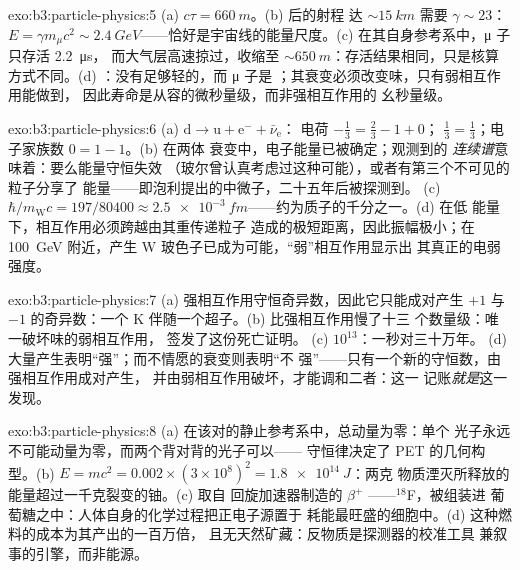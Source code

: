 \begin{solution}{exo:b3:particle-physics:5}
(a) $c\tau = \qty{660}{m}$。(b) 后的射程
达 ${\sim}\qty{15}{km}$ 需要 $\gamma \sim 23$：$E = \gamma
m_\mu c^2 \sim \qty{2.4}{GeV}$——恰好是宇宙线的能量尺度。(c)
在其自身参考系中，μ 子只存活 \qty{2.2}{\micro s}，
而大气层高速掠过，收缩至
${\sim}\qty{650}{m}$：存活结果相同，只是核算方式不同。(d) ：没有足够轻的，而 μ 子是
；其衰变必须改变味，只有弱相互作用能做到，
因此寿命是从容的微秒量级，而非强相互作用的
幺秒量级。
\end{solution}

\begin{solution}{exo:b3:particle-physics:6}
(a) $\text{d} \to \text{u} + \text{e}^- + \bar\nu_{\text{e}}$：
电荷 $-\tfrac13 = \tfrac23 - 1 + 0$；
$\tfrac13 = \tfrac13$；电子家族数 $0 = 1 - 1$。(b) 在两体
衰变中，电子能量已被确定；观测到的
\emph{连续谱}意味着：要么能量守恒失效
（玻尔曾认真考虑过这种可能），或者有第三个不可见的粒子分享了
能量——即泡利提出的中微子，二十五年后被探测到。
(c) $\hbar/m_{\text{W}}c = 197/80400 \approx
\qty{2.5e-3}{fm}$——约为质子的千分之一。(d) 在低
能量下，相互作用必须跨越由其重传递粒子
造成的极短距离，因此振幅极小；在
\qty{100}{GeV} 附近，产生 W 玻色子已成为可能，“弱”相互作用显示出
其真正的电弱强度。
\end{solution}

\begin{solution}{exo:b3:particle-physics:7}
(a) 强相互作用守恒奇异数，因此它只能成对产生
$+1$ 与 $-1$ 的奇异数：一个 K 伴随一个超子。(b) 比强相互作用慢了十三
个数量级：唯一破坏味的弱相互作用，
签发了这份死亡证明。
(c) $10^{13}$：一秒对三十万年。
(d) 大量产生表明“强”；而不情愿的衰变则表明“不
强”——只有一个新的守恒数，由强相互作用成对产生，
并由弱相互作用破坏，才能调和二者：这一
记账\emph{就是}这一发现。
\end{solution}

\begin{solution}{exo:b3:particle-physics:8}
(a) 在该对的静止参考系中，总动量为零：单个
光子永远不可能动量为零，而两个背对背的光子可以——
守恒律决定了 PET 的几何构型。(b) $E = mc^2 =
0.002\times(3\times10^8)^2 = \qty{1.8e14}{J}$：两克
物质湮灭所释放的能量超过一千克裂变的铀。(c) 取自
回旋加速器制造的 $\beta^+$ ——$^{18}$F，被组装进
葡萄糖之中：人体自身的化学过程把正电子源置于
耗能最旺盛的细胞中。(d) 这种燃料的成本为其产出的一百万倍，
且无天然矿藏：反物质是探测器的校准工具
兼叙事的引擎，而非能源。
\end{solution}


